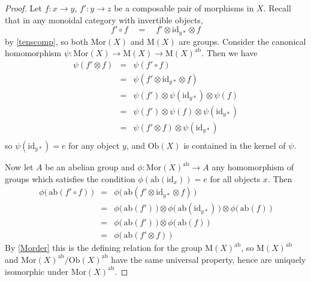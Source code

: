\documentclass{amsbook} %
\numberwithin{section}{chapter}
\begin{document}
\begin{proof}
Let  $f: x \to y$, $f': y \to z$ be a composable pair of morphisms in $X$. Recall  that in any monoidal category with invertible objects,
\[ f' \circ f \quad = \quad f' \otimes \mathrm{id}_{y*} \otimes f \]
by \cref{tenscomp}, so both $\mathrm{Mor}(X)$ and $\mathrm{M}(X)$ are groups. Consider the canonical homomorphism $\psi: \mathrm{Mor}(X) \to \mathrm{M}(X) \to \mathrm{M}(X)^{\mathrm{ab}}$. Then we have
\[ \begin{array}{rll}
			\psi(f' \otimes f) & = & \psi(f' \circ f) \\
			& = & \psi(f' \otimes \mathrm{id}_{y*} \otimes f) \\
			& = & \psi(f') \otimes \psi(\mathrm{id}_{y*}) \otimes \psi(f) \\
			& = & \psi(f') \otimes \psi(f) \otimes \psi(\mathrm{id}_{y*}) \\
			& = & \psi(f' \otimes f) \otimes \psi(\mathrm{id}_{y*}) \\
		\end{array}
\]
so $\psi(\mathrm{id}_{y*}) = e$ for any object $y$, and $\mathrm{Ob}(X)$ is contained in the kernel of $\psi$.

Now let $A$ be an abelian group and $\phi: \mathrm{Mor}(X)^{\mathrm{ab}} \to A$ any homomorphism of groups which satisfies the condition $\phi(\mathrm{ab}(\mathrm{id}_x)) = e$ for all objects $x$. Then
\[ \begin{array}{rll}
			\phi\big( \, \mathrm{ab}(f' \circ f) \, \big)  & = & \phi\big( \, \mathrm{ab}(f' \otimes \mathrm{id}_{y*} \otimes f) \, \big) \\
			& = & \phi\big( \, \mathrm{ab}(f') \, \big) \otimes \phi\big( \, \mathrm{ab}(\mathrm{id}_{y*}) \, \big) \otimes \phi\big( \, \mathrm{ab}(f) \, \big) \\
			& = & \phi\big( \, \mathrm{ab}(f') \, \big) \otimes \phi\big( \, \mathrm{ab}(f) \, \big) \\
			& = & \phi\big( \, \mathrm{ab}(f' \otimes f) \, \big)
		\end{array}
\]
By \cref{Morder} this is the defining relation for the group $\mathrm{M}(X)^{\mathrm{ab}}$, so $\mathrm{M}(X)^{\mathrm{ab}}$ and $\mathrm{Mor}(X)^{\mathrm{ab}}/\mathrm{Ob}(X)^{\mathrm{ab}}$ have the same universal property, hence are uniquely isomorphic under $\mathrm{Mor}(X)^{\mathrm{ab}}$.




\end{proof}
\end{document}
